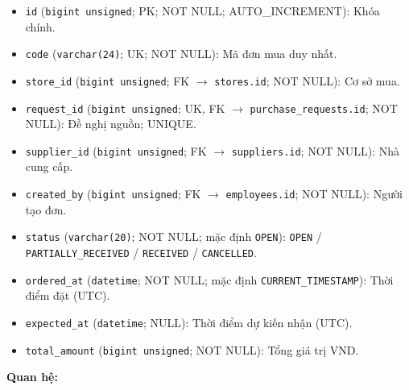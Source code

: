 \begin{itemize}

\item \texttt{id} (\texttt{bigint unsigned}; PK; NOT NULL; AUTO_INCREMENT): Khóa chính.

\item \texttt{code} (\texttt{varchar(24)}; UK; NOT NULL): Mã đơn mua duy nhất.

\item \texttt{store\_id} (\texttt{bigint unsigned}; FK $\rightarrow$ \texttt{stores.id}; NOT NULL): Cơ sở mua.

\item \texttt{request\_id} (\texttt{bigint unsigned}; UK, FK $\rightarrow$ \texttt{purchase\_requests.id}; NOT NULL): Đề nghị nguồn; UNIQUE.

\item \texttt{supplier\_id} (\texttt{bigint unsigned}; FK $\rightarrow$ \texttt{suppliers.id}; NOT NULL): Nhà cung cấp.

\item \texttt{created\_by} (\texttt{bigint unsigned}; FK $\rightarrow$ \texttt{employees.id}; NOT NULL): Người tạo đơn.

\item \texttt{status} (\texttt{varchar(20)}; NOT NULL; mặc định \texttt{OPEN}): \texttt{OPEN} / \texttt{PARTIALLY\_RECEIVED} / \texttt{RECEIVED} / \texttt{CANCELLED}.

\item \texttt{ordered\_at} (\texttt{datetime}; NOT NULL; mặc định \texttt{CURRENT\_TIMESTAMP}): Thời điểm đặt (UTC).

\item \texttt{expected\_at} (\texttt{datetime}; NULL): Thời điểm dự kiến nhận (UTC).

\item \texttt{total\_amount} (\texttt{bigint unsigned}; NOT NULL): Tổng giá trị VND.

\end{itemize}

\textbf{Quan hệ:}

